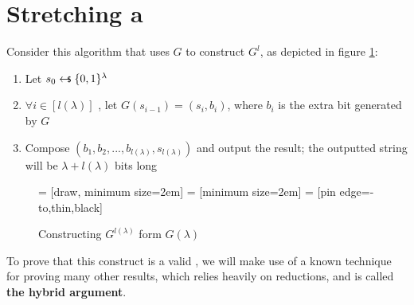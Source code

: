 
\section{Stretching a \prg}

Consider this algorithm that uses $G$ to construct $G^{l}$, as depicted in figure \ref{fig:gpowerl}:
\begin{enumerate}
    \item Let $s_{0} \pickUAR \{0,1\}^{\lambda}$
    \item $ \forall i \in [l(\lambda)] $ , let $G(s_{i-1}) = (s_{i}, b_{i})$, where $b_i$ is the extra bit generated by $G$
    \item Compose $(b_{1}, b_{2}, ..., b_{{l(\lambda)}}, s_{{l(\lambda)}})$ and output the result; the outputted string will be $\lambda + l(\lambda)$ bits long
\end{enumerate}

\begin{figure}[h]

      = [draw, minimum size=2em]
      = [minimum size=2em]
     = [pin edge={-to,thin,black}]

    \caption{Constructing $G^{l(\lambda)}$ form $G(\lambda)$}
    \label{fig:gpowerl}
\end{figure}

To prove that this construct is a valid \prg, we will make use of a known technique for proving many other results, which relies heavily on reductions, and is called \textbf{the hybrid argument}.
    
